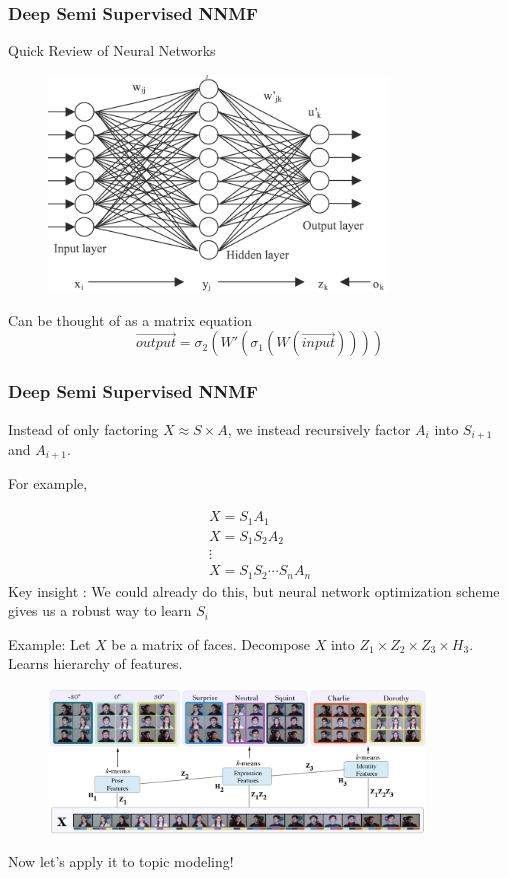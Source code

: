 \documentclass{beamer}
\begin{document}
						\begin{frame}
							\frametitle{Deep Semi Supervised NNMF}
							Quick Review of Neural Networks
	\begin{figure}
		\centering
			\includegraphics[width=9cm]{NeuralNetwork}
	\end{figure}

	
	Can be thought of as a matrix equation
	\begin{equation*}
	\overrightarrow{output} = \sigma_2 (W'(\sigma_1(W(\overrightarrow{input})))) 
	\end{equation*}
						\end{frame}
							\begin{frame}
								\frametitle{Deep Semi Supervised NNMF}
								Instead of only factoring $X \approx S \times A$, we instead recursively factor $A_i$ into $S_{i+1}$ and $A_{i+1}$.
								
								For example, 
								
\begin{align*}
X = S_1A_1\\X = S_1S_2A_2\\ \vdots \\X = S_1S_2 \cdots S_n A_n
\end{align*}
Key insight : We could already do this, but neural network optimization scheme gives us a robust way to learn $S_i$ 
									\end{frame}
									\begin{frame}
								Example: Let $X$ be a matrix of faces. Decompose $X$ into $Z_1 \times Z_2 \times Z_3 \times H_3$. Learns hierarchy of features.
								\begin{figure}
									\centering
										\includegraphics[width=10cm]{dsnnmf}
								\end{figure}
									Now let's apply it to topic modeling!
							\end{frame}
\end{document}
